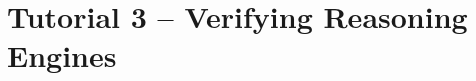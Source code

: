 {
  \let\section\subsection
  \let\subsection\subsubsection
  \let\subsubsection\paragraph
  
  
  }

\section{Tutorial 3 -- Verifying Reasoning Engines}

{
  \let\section\subsection
  \let\subsection\subsubsection
  \let\subsubsection\paragraph
  
  
  }
